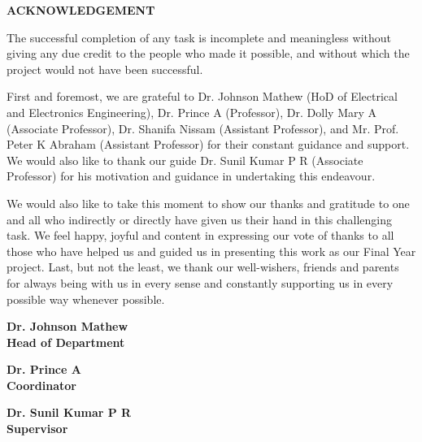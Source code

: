 \begin{center}
    \Large  \textbf{ACKNOWLEDGEMENT}\\
\end{center}
    \vspace{0.5cm}
     
The successful completion of any task is incomplete and meaningless without giving any due credit to the people who made it possible, and without which the project would not have been successful.
     
First and foremost, we are grateful to Dr. Johnson Mathew (HoD of Electrical and Electronics Engineering), Dr. Prince A (Professor), Dr. Dolly Mary A (Associate Professor), Dr. Shanifa Nissam (Assistant Professor), and Mr. Prof. Peter K Abraham (Assistant Professor) for their constant guidance and support. We would also like to thank our guide Dr. Sunil Kumar P R (Associate Professor) for his motivation and guidance in undertaking this endeavour.
     
We would also like to take this moment to show our thanks and gratitude to one and all who indirectly or directly have given us their hand in this challenging task. We feel happy, joyful and content in expressing our vote of thanks to all those who have helped us and guided us in presenting this work as our Final Year project. Last, but not the least, we thank our well-wishers, friends and parents for always being with us in every sense and constantly supporting us in every possible way whenever possible.

\vspace{2 cm}     

\begin{multicols}{3}
\centering
\textbf{Dr. Johnson Mathew}\\
\textbf{Head of Department}\\
\vspace{0.3cm}

\textbf{Dr. Prince A}\\
\textbf{Coordinator}\\
\vspace{0.3cm}

\textbf{Dr. Sunil Kumar P R}\\
\textbf{Supervisor}\\
\vspace{0.3cm}
\end{multicols}